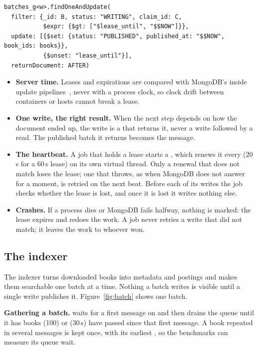 \begin{lstlisting}
batches_g<w>.findOneAndUpdate(
  filter: {_id: B, status: "WRITING", claim_id: C,
           $expr: {$gt: ["$lease_until", "$$NOW"]}},
  update: [{$set: {status: "PUBLISHED", published_at: "$$NOW", book_ids: books}},
           {$unset: "lease_until"}],
  returnDocument: AFTER)
\end{lstlisting}

\begin{itemize}
\item \textbf{Server time.} Leases and expirations are compared with MongoDB's  inside update pipelines~\cite{mongodb},
  never with a process clock, so clock drift between containers or hosts cannot break a lease.
\item \textbf{One write, the right result.} When the next step depends on how the document ended up, the write is a
   that returns it, never a write followed by a read. The published batch it returns becomes the
   message.
\item \textbf{The heartbeat.} A job that holds a lease starts a , which renews it every
   (20\,s for a 60\,s lease) on its own virtual thread. Only a renewal that does not
  match loses the lease; one that throws, as when MongoDB does not answer for a moment, is retried on the next beat.
  Before each of its writes the job checks whether the lease is lost, and once it is lost it writes nothing else.
\item \textbf{Crashes.} If a process dies or MongoDB fails halfway, nothing is marked: the lease expires and
   redoes the work. A job never retries a write that did not match; it leaves the work to whoever won.
\end{itemize}

\subsection{The indexer}
\label{sec:indexer}

The indexer turns downloaded books into metadata and postings and makes them searchable one batch at a time. Nothing a
batch writes is visible until a single write publishes it. Figure~\ref{fig:batch} shows one batch.

\textbf{Gathering a batch.}  waits for a first message on  and then drains the
queue until it has  books (100) or  (30\,s) have
passed since that first message. A book repeated in several messages is kept once, with its earliest
, so the benchmarks can measure its queue wait.

